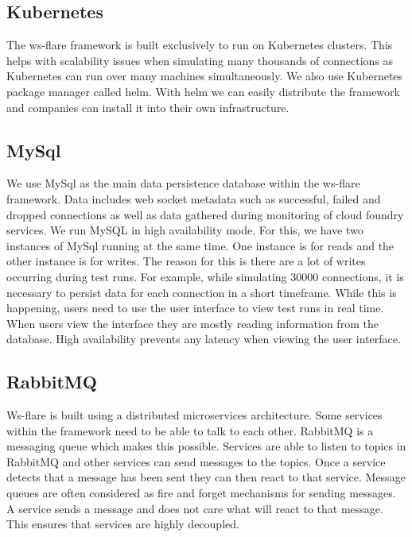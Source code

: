 \subsection{Kubernetes}

The ws-flare framework is built exclusively to run on Kubernetes clusters. This helps with scalability issues when simulating many thousands of connections as Kubernetes can run over many machines simultaneously. We also use Kubernetes package manager called helm. With helm we can easily distribute the framework and companies can install it into their own infrastructure.

\subsection{MySql}

We use MySql as the main data persistence database within the ws-flare framework. Data includes web socket metadata such as successful, failed and dropped connections as well as data gathered during monitoring of cloud foundry services. We run MySQL in high availability mode. For this, we have two instances of MySql running at the same time. One instance is for reads and the other instance is for writes. The reason for this is there are a lot of writes occurring during test runs. For example, while simulating 30000 connections, it is necessary to persist data for each connection in a short timeframe. While this is happening, users need to use the user interface to view test runs in real time. When users view the interface they are mostly reading information from the database. High availability prevents any latency when viewing the user interface.

\subsection{RabbitMQ}

Ws-flare is built using a distributed microservices architecture. Some services within the framework need to be able to talk to each other. RabbitMQ is a messaging queue which makes this possible. Services are able to listen to topics in RabbitMQ and other services can send messages to the topics. Once a service detects that a message has been sent they can then react to that service. Message queues are often considered as fire and forget mechanisms for sending messages. A service sends a message and does not care what will react to that message. This ensures that services are highly decoupled.

